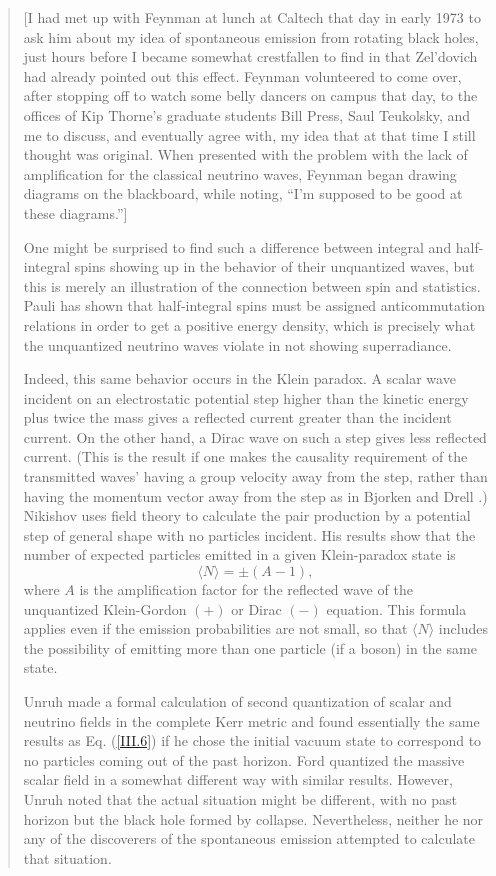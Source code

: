 \documentclass[12pt]{article} \usepackage{latexsym} \textwidth 15cm
\begin{document}
\begin{quotation}
[I had met up with Feynman at lunch at Caltech that day in early 1973
to ask him about my idea of spontaneous emission from rotating black
holes, just hours before I became somewhat crestfallen to find in
\cite{Zel1} that Zel'dovich had already pointed out this effect.
Feynman volunteered to come over, after stopping off to watch some
belly dancers on campus that day, to the offices of Kip Thorne's
graduate students Bill Press, Saul Teukolsky, and me to discuss, and
eventually agree with, my idea that at that time I still thought was
original.  When presented with the problem with the lack of
amplification for the classical neutrino waves, Feynman began drawing
diagrams on the blackboard, while noting, ``I'm supposed to be good at
these diagrams.'']

One might be surprised to find such a difference between integral and
half-integral spins showing up in the behavior of their unquantized
waves, but this is merely an illustration of the connection between
spin and statistics.  Pauli \cite{Pauli} has shown that half-integral
spins must be assigned anticommutation relations in order to get a
positive energy density, which is precisely what the unquantized
neutrino waves violate in not showing superradiance.

Indeed, this same behavior occurs in the Klein paradox.  A scalar wave
incident on an electrostatic potential step higher than the kinetic
energy plus twice the mass gives a reflected current greater than the
incident current.  On the other hand, a Dirac wave on such a step
gives less reflected current.  (This is the result if one makes the
causality requirement of the transmitted waves' having a group
velocity away from the step, rather than having the momentum vector
away from the step as in Bjorken and Drell \cite{BD}.)  Nikishov
\cite{Nik} uses field theory to calculate the pair production by a
potential step of general shape with no particles incident.  His
results show that the number of expected particles emitted in a given
Klein-paradox state is
 \begin{equation}
 \langle N \rangle = \pm (A-1),
 \label{III.6}
 \end{equation}
where $A$ is the amplification factor for the reflected wave of the
unquantized Klein-Gordon $(+)$ or Dirac $(-)$ equation.  This formula
applies even if the emission probabilities are not small, so that
$\langle N \rangle$ includes the possibility of emitting more than one
particle (if a boson) in the same state.

Unruh \cite{Unruh74} made a formal calculation of second quantization
of scalar and neutrino fields in the complete Kerr metric and found
essentially the same results as Eq. (\ref{III.6}) if he chose the
initial vacuum state to correspond to no particles coming out of the
past horizon.  Ford \cite{Ford} quantized the massive scalar field in
a somewhat different way with similar results.  However, Unruh noted
that the actual situation might be different, with no past horizon but
the black hole formed by collapse.  Nevertheless, neither he nor any
of the discoverers of the spontaneous emission attempted to calculate
that situation.


\end{quotation}
\end{document}
